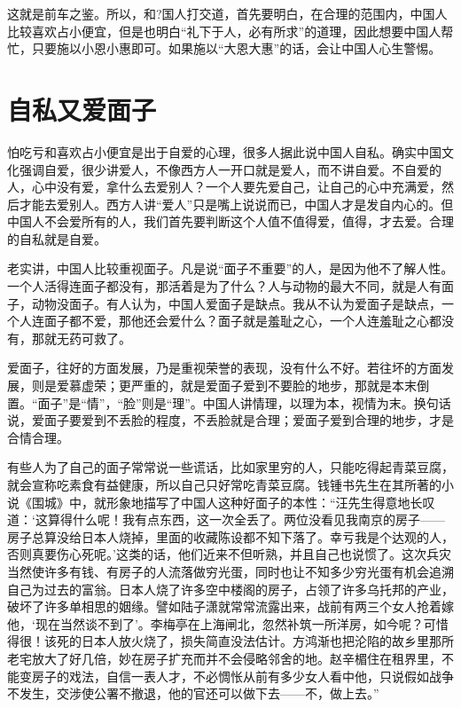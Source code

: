 \documentclass[fontset=fandol, a4paper, 12pt, openright]{ctexbook}
\begin{document}
这就是前车之鉴。所以，和?国人打交道，首先要明白，在合理的范围内，中国人比较喜欢占小便宜，但是也明白“礼下于人，必有所求”的道理，因此想要中国人帮忙，只要施以小恩小惠即可。如果施以“大恩大惠”的话，会让中国人心生警惕。

\section{自私又爱面子}

怕吃亏和喜欢占小便宜是出于自爱的心理，很多人据此说中国人自私。确实中国文化强调自爱，很少讲爱人，不像西方人一开口就是爱人，而不讲自爱。不自爱的人，心中没有爱，拿什么去爱别人？一个人要先爱自己，让自己的心中充满爱，然后才能去爱别人。西方人讲“爱人”只是嘴上说说而已，中国人才是发自内心的。但中国人不会爱所有的人，我们首先要判断这个人值不值得爱，值得，才去爱。合理的自私就是自爱。

老实讲，中国人比较重视面子。凡是说“面子不重要”的人，是因为他不了解人性。一个人活得连面子都没有，那活着是为了什么？人与动物的最大不同，就是人有面子，动物没面子。有人认为，中国人爱面子是缺点。我从不认为爱面子是缺点，一个人连面子都不爱，那他还会爱什么？面子就是羞耻之心，一个人连羞耻之心都没有，那就无药可救了。

爱面子，往好的方面发展，乃是重视荣誉的表现，没有什么不好。若往坏的方面发展，则是爱慕虚荣；更严重的，就是爱面子爱到不要脸的地步，那就是本末倒置。“面子”是“情”，“脸”则是“理”。中国人讲情理，以理为本，视情为末。换句话说，爱面子要爱到不丢脸的程度，不丢脸就是合理；爱面子爱到合理的地步，才是合情合理。

有些人为了自己的面子常常说一些谎话，比如家里穷的人，只能吃得起青菜豆腐，就会宣称吃素食有益健康，所以自己只好常吃青菜豆腐。钱锺书先生在其所著的小说《围城》中，就形象地描写了中国人这种好面子的本性：“汪先生得意地长叹道：‘这算得什么呢！我有点东西，这一次全丢了。两位没看见我南京的房子——房子总算没给日本人烧掉，里面的收藏陈设都不知下落了。幸亏我是个达观的人，否则真要伤心死呢。’这类的话，他们近来不但听熟，并且自己也说惯了。这次兵灾当然使许多有钱、有房子的人流落做穷光蛋，同时也让不知多少穷光蛋有机会追溯自己为过去的富翁。日本人烧了许多空中楼阁的房子，占领了许多乌托邦的产业，破坏了许多单相思的姻缘。譬如陆子潇就常常流露出来，战前有两三个女人抢着嫁他，‘现在当然谈不到了’。李梅亭在上海闸北，忽然补筑一所洋房，如今呢？可惜得很！该死的日本人放火烧了，损失简直没法估计。方鸿渐也把沦陷的故乡里那所老宅放大了好几倍，妙在房子扩充而并不会侵略邻舍的地。赵辛楣住在租界里，不能变房子的戏法，自信一表人才，不必惆怅从前有多少女人看中他，只说假如战争不发生，交涉使公署不撤退，他的官还可以做下去——不，做上去。”
\end{document}
